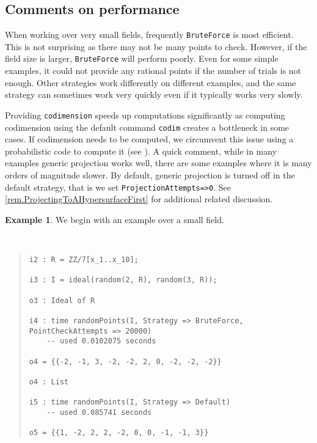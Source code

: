 \documentclass[11pt]{amsart}
\theoremstyle{definition}
\newtheorem{example}{Example}[section]
\begin{document}
    \subsection{Comments on performance}

    When working over very small fields, frequently {\tt BruteForce} is most efficient.  This is not surprising as there may not be many points to check.  However, if the field size is larger, {\tt BruteForce} will perform poorly.  Even for some simple examples, it could not provide any rational points if the number of trials is not enough.  Other strategies work differently on different examples, and the same strategy can sometimes work very quickly even if it typically works very slowly.  
    
    Providing {\tt codimension} speeds up computations significantly as computing codimension using the default command {\tt codim} creates a bottleneck in some cases. If codimension needs to be computed, we  circumvent this issue using a probabilistic code to compute it (see ). A quick comment, while in many examples generic projection works well, there are some examples where it is many orders of magnitude slower.  By default, generic projection is turned off in the default strategy, that is we set {\tt ProjectionAttempts=>0}.  See \autoref{rem.ProjectingToAHypersurfaceFirst} for additional related discussion.


    \begin{example}
        We begin with an example over a small field.
    {{\small\color{blue}
    ~~
    \begin{quote}
\begin{verbatim}
i2 : R = ZZ/7[x_1..x_10];

i3 : I = ideal(random(2, R), random(3, R));

o3 : Ideal of R

i4 : time randomPoints(I, Strategy => BruteForce, PointCheckAttempts => 20000)
    -- used 0.0102075 seconds
    
o4 = {{-2, -1, 3, -2, -2, 2, 0, -2, -2, -2}}

o4 : List

i5 : time randomPoints(I, Strategy => Default)
    -- used 0.085741 seconds
    
o5 = {{1, -2, 2, 2, -2, 0, 0, -1, -1, 3}}
    \end{verbatim}
\end{quote}\vspace{-1em}
    }}
    \end{example}    
\end{document}
